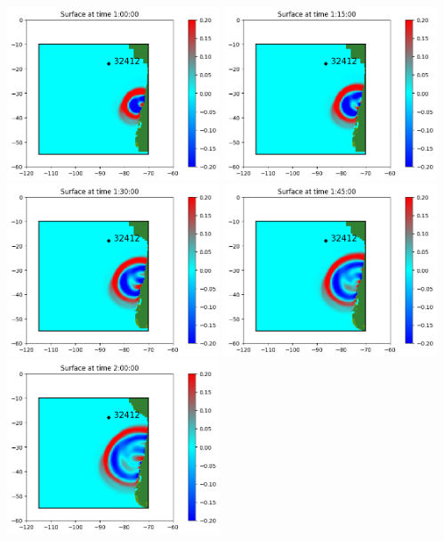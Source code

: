 \documentclass[11pt]{article}
\begin{document}
\vskip 10pt 
\includegraphics[width=0.475\textwidth]{fgout0001frame0005fig0.png}
\vskip 10pt 
\includegraphics[width=0.475\textwidth]{fgout0001frame0006fig0.png}
\vskip 10pt 
\includegraphics[width=0.475\textwidth]{fgout0001frame0007fig0.png}
\vskip 10pt 
\includegraphics[width=0.475\textwidth]{fgout0001frame0008fig0.png}
\vskip 10pt 
\includegraphics[width=0.475\textwidth]{fgout0001frame0009fig0.png}
\end{document}

